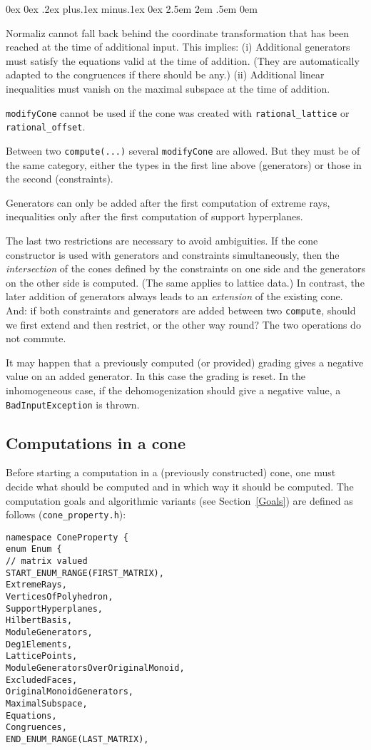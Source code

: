 \documentclass[12pt,a4paper]{scrartcl}
\newcounter{listi}
\newcommand{\stdli}{ \topsep0ex \partopsep0ex %
\parsep.2ex plus.1ex minus.1ex \itemsep0ex%
\leftmargin2.5em \labelwidth2em \labelsep.5em \rightmargin0em}%
\newenvironment{arab}{\begin{list}{\textup{(\arabic{listi})}}%
	{\usecounter{listi}\stdli}}{\end{list}}
\theoremstyle{definition}
\begin{document}
\begin{small}
\begin{arab}
\item Normaliz cannot fall back behind the coordinate transformation that has been reached at the time of additional input. This implies: (i) Additional generators must satisfy the equations valid at the time of addition. (They are automatically adapted to the congruences if there should be any.) (ii) Additional linear inequalities must vanish on the maximal subspace at the time of addition.

\item \verb|modifyCone| cannot be used if the cone was created with \verb|rational_lattice| or \verb|rational_offset|.

\item Between two \verb|compute(...)| several \verb|modifyCone| are allowed. But they must be of the same category, either the types in the first line above (generators) or those in the second (constraints).

\item Generators can only be added after the first computation of extreme rays, inequalities only after the first computation of support hyperplanes.

\end{arab}

The last two restrictions are necessary to avoid ambiguities. If the cone constructor is used with generators and constraints simultaneously, then the \emph{intersection} of the cones defined by the constraints on one side and the generators on the other side is computed. (The same applies to lattice data.) In contrast, the later addition of generators always leads to an \emph{extension} of the existing cone. And: if both constraints and generators are added between two \verb|compute|, should we first extend and then restrict, or the other way round? The two operations do not commute.

It may happen that a previously computed (or provided) grading gives a negative value on an added generator. In this case the grading is reset. In the inhomogeneous case, if the dehomogenization should give a negative value, a \verb|BadInputException| is thrown.

\subsection{Computations in a cone}

Before starting a computation in a (previously constructed) cone, one must decide what should be computed and in which way it should be computed. The computation goals and algorithmic variants (see Section~\ref{Goals}) are defined as follows (\verb|cone_property.h|):
\begin{Verbatim}
namespace ConeProperty {
enum Enum {
// matrix valued
START_ENUM_RANGE(FIRST_MATRIX),
ExtremeRays,
VerticesOfPolyhedron,
SupportHyperplanes,
HilbertBasis,
ModuleGenerators,
Deg1Elements,
LatticePoints,
ModuleGeneratorsOverOriginalMonoid,
ExcludedFaces,
OriginalMonoidGenerators,
MaximalSubspace,
Equations,
Congruences,
END_ENUM_RANGE(LAST_MATRIX),


\end{Verbatim}
\end{small}
\end{document}
